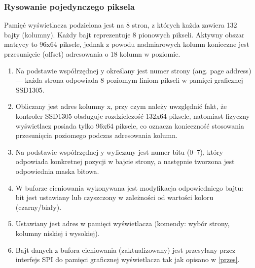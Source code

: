 \subsubsection {Rysowanie pojedynczego piksela}
\label{piksel}
Pamięć wyświetlacza podzielona jest na 8 stron, z których każda zawiera 132 bajty (kolumny). Każdy bajt reprezentuje 8 pionowych pikseli. Aktywny obszar matrycy to 96x64 piksele, jednak z powodu nadmiarowych kolumn konieczne jest przesunięcie (offset) adresowania o 18 kolumn w poziomie.

\begin{enumerate}
    \item Na podstawie współrzędnej y określany jest numer strony (ang. page address) — każda strona odpowiada 8 poziomym liniom pikseli w pamięci graficznej SSD1305.
    \item Obliczany jest adres kolumny x, przy czym należy uwzględnić fakt, że kontroler SSD1305 obsługuje rozdzielczość 132x64 piksele, natomiast fizyczny wyświetlacz posiada tylko 96x64 piksele, co oznacza konieczność stosowania przesunięcia poziomego podczas adresowania kolumn.
    \item Na podstawie współrzędnej y wyliczany jest numer bitu (0–7), który odpowiada konkretnej pozycji w bajcie strony, a następnie tworzona jest odpowiednia maska bitowa.
    \item W buforze cieniowania wykonywana jest modyfikacja odpowiedniego bajtu: bit jest ustawiany lub czyszczony w zależności od wartości koloru (czarny/biały).
    \item Ustawiany jest adres w pamięci wyświetlacza (komendy: wybór strony, kolumny niskiej i wysokiej).
    \item Bajt danych z bufora cieniowania (zaktualizowany) jest przesyłany przez interfejs SPI do pamięci graficznej wyświetlacza tak jak opisano w \ref{przes}.
\end{enumerate}

